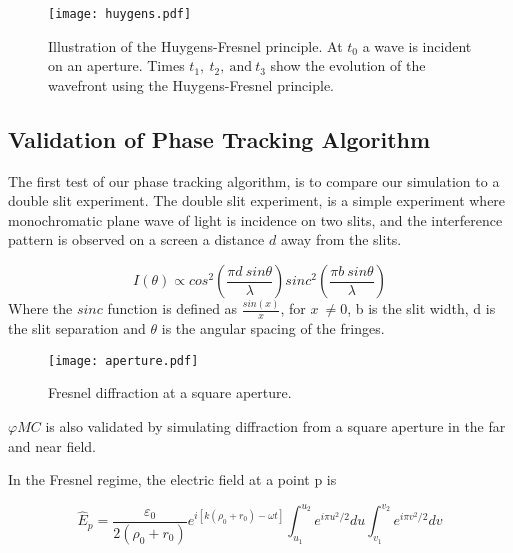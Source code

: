 %

\begin{figure}[!ht]
    \centering
    \texttt{[image: huygens.pdf]}
    \caption{Illustration of the Huygens-Fresnel principle. At $t_0$ a wave is incident on an aperture. Times $t_1,\ t_2,\ \text{and}\ t_3$ show the evolution of the wavefront using the Huygens-Fresnel principle.}
    \label{fig:huygensillis}
\end{figure}

\subsection{Validation of Phase Tracking Algorithm}

The first test of our phase tracking algorithm, is to compare our simulation to a double slit experiment.
The double slit experiment, is a simple experiment where monochromatic plane wave of light is incidence on two slits, and the interference pattern is observed on a screen a distance $d$ away from the slits.


\begin{equation}
    I(\theta) \propto cos^2\left(\frac{\pi d\ sin \theta}{\lambda}\right)sinc^2\left(\frac{\pi b\ sin\theta}{\lambda}\right)
\end{equation}
Where the $sinc$ function is defined as $\tfrac{sin(x)}{x}$, for $x\ \neq 0$, b is the slit width, d is the slit separation and $\theta$ is the angular spacing of the fringes.


\begin{figure}[!ht]
    \centering
    \texttt{[image: aperture.pdf]}
    \caption{Fresnel diffraction at a square aperture.}
    \label{fig:aperture}
\end{figure}

$\varphi MC$ is also validated by simulating diffraction from a square aperture in the far and near field.

In the Fresnel regime, the electric field at a point p is

\begin{equation}
\hat{E}_p=\frac{\varepsilon_0}{2(\rho_0+r_0)}e^{i[k(\rho_0+r_0)-\omega t]}\int^{u_2}_{u_1} e^{i\pi u^2/2}du \int^{v_2}_{v_1} e^{i\pi v^2/2}dv
\end{equation}

